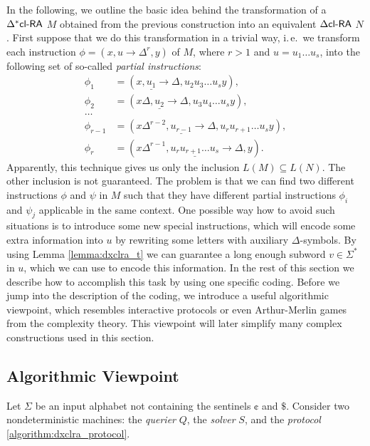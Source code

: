 In the following, we outline the basic idea behind the transformation of a $\textup{\sf $\Delta^*$cl-RA\/}$ $M$ obtained from the previous construction into an equivalent $\textup{\sf $\Delta$cl-RA\/}$ $N$. First suppose that we do this transformation in a trivial way, i.\,e.\ we transform each instruction $\phi = (x, u \to \Delta^r, y)$ of $M$, where $r > 1$ and $u = u_1 \ldots u_s$, into the following set of so-called \emph{partial instructions}:
$$
\begin{array}{ll}
\phi_1 & = (x, \underline{u_1} \to \Delta, u_2 u_3 \ldots u_s y),\\
\phi_2 & = (x \Delta, \underline{u_2} \to \Delta, u_3 u_4 \ldots u_s y),\\
\ldots\\
\phi_{r-1} & = (x \Delta^{r-2}, \underline{u_{r-1}} \to
\Delta, u_r u_{r+1} \ldots u_s y),\\
\phi_r & = (x \Delta^{r-1}, \underline{u_r u_{r+1} \ldots u_s} \to \Delta, y).
\end{array}
$$
Apparently, this technique gives us only the inclusion $L(M) \subseteq L(N)$. The other inclusion is not guaranteed. The problem is that we can find two different instructions $\phi$ and $\psi$ in $M$ such that they have different partial instructions $\phi_i$ and $\psi_j$ applicable in the same context. One possible way how to avoid such situations is to introduce some new special instructions, which will encode some extra information into $u$ by rewriting some letters with auxiliary $\Delta$-symbols. By using Lemma \ref{lemma:dxclra_t} we can guarantee a long enough subword $v \in \Sigma^*$ in $u$, which we can use to encode this information. In the rest of this section we describe how to accomplish this task by using one specific coding. Before we jump into the description of the coding, we introduce a useful algorithmic viewpoint, which resembles interactive protocols or even Arthur-Merlin games from the complexity theory. This viewpoint will later simplify many complex constructions used in this section.

\subsection{Algorithmic Viewpoint}\label{section:dxclra_viewpoint}

Let $\Sigma$ be an input alphabet not containing the sentinels $\cent$ and $\$$. Consider two nondeterministic machines: the \emph{querier} $Q$, the \emph{solver} $S$, and the \emph{protocol} \ref{algorithm:dxclra_protocol}.

